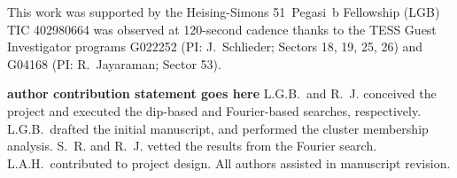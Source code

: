 \documentclass[11pt,twocolumn,tighten]{aastex63}
\begin{document}
\acknowledgments
This work was supported by the 
Heising-Simons 51~Pegasi~b Fellowship (LGB)
TIC 402980664 was observed at 120-second cadence thanks to the TESS Guest
Investigator programs G022252 (PI: J.~Schlieder; Sectors 18, 19, 25,
26) and G04168 (PI: R.~Jayaraman; Sector 53).

{\bf author contribution statement goes here}
L.G.B.~and R.~J. conceived the project and executed the
dip-based and Fourier-based searches, respectively.
L.G.B.~drafted the initial manuscript, and performed the cluster
membership analysis.
S.~R. and R.~J. vetted the results from the Fourier search.
L.A.H.~contributed to project design.
All authors assisted in manuscript revision.


\ 
\end{document}

